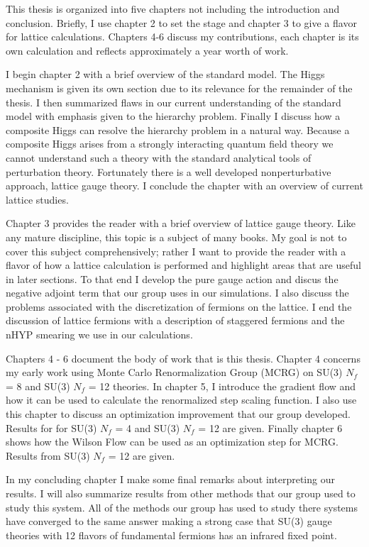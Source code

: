 This thesis is organized into five chapters not including the introduction and conclusion.
Briefly, I use chapter 2 to set the stage and chapter 3 to give a flavor for lattice calculations.
Chapters 4-6 discuss my contributions, each chapter is its own calculation and reflects approximately a year worth of work.

I begin chapter 2 with a brief overview of the standard model.
The Higgs mechanism is given its own section due to its relevance for the remainder of the thesis.
I then summarized flaws in our current understanding of the standard model with emphasis given to the hierarchy problem.
Finally I discuss how a composite Higgs can resolve the hierarchy problem in a natural way.
Because a composite Higgs arises from a strongly interacting quantum field theory we cannot understand such a theory with the standard analytical tools of perturbation theory.
Fortunately there is a well developed nonperturbative approach, lattice gauge theory.
I conclude the chapter with an overview of current lattice studies.

Chapter 3 provides the reader with a brief overview of lattice gauge theory.
Like any mature discipline, this topic is a subject of many books.
My goal is not to cover this subject comprehensively; rather I want to provide the reader with a flavor of how a lattice calculation is performed and highlight areas that are useful in later sections.
To that end I develop the pure gauge action and discus the negative adjoint term that our group uses in our simulations.
I also discuss the problems associated with the discretization of fermions on the lattice.
I end the discussion of lattice fermions with a description of staggered fermions and the nHYP smearing we use in our calculations.

Chapters 4 - 6 document the body of work that is this thesis.
Chapter 4 concerns my early work using Monte Carlo Renormalization Group (MCRG) on SU(3) $N_f$ = 8 and SU(3) $N_f$ = 12 theories.
In chapter 5, I introduce the gradient flow and how it can be used to calculate the renormalized step scaling function.
I also use this chapter to discuss an optimization improvement that our group developed.
Results for for SU(3) $N_f$ = 4 and SU(3) $N_f$ = 12 are given.
Finally chapter 6 shows how the Wilson Flow can be used as an optimization step for MCRG.
Results from SU(3) $N_f$ = 12 are given.

In my concluding chapter I make some final remarks about interpreting our results.
I will also summarize results from other methods that our group used to study this system.
All of the methods our group has used to study there systems have converged to the same answer making a strong case that SU(3) gauge theories with 12 flavors of fundamental fermions has an infrared fixed point.
